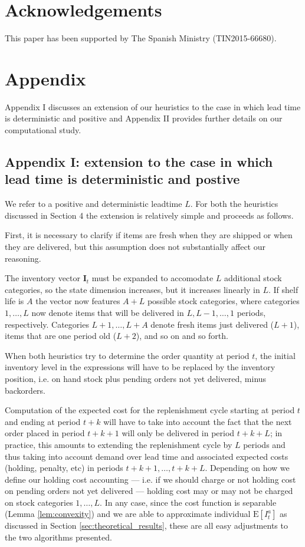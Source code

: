 \documentclass{tPRS2e}
\begin{document}
\section*{Acknowledgements}
This paper has been supported by The Spanish Ministry (TIN2015-66680).



\section*{Appendix}

Appendix I discusses an extension of our heuristics to the case in which lead time is deterministic and positive and Appendix II provides further details on our computational study.

\subsection*{Appendix I: extension to the case in which lead time is deterministic and postive}
\label{sec:appendix_I}

We refer to a positive and deterministic leadtime $L$. For both the heuristics discussed in Section 4 the extension is relatively simple and proceeds as follows. 

First, it is necessary to clarify if items are fresh when they are shipped or when they are delivered, but this assumption does not substantially affect our reasoning. 

The inventory vector $\mathbf{I}_t$ must be expanded to accomodate $L$ additional stock categories, so the state dimension increases, but it increases linearly in $L$. If shelf life is $A$ the vector now features $A+L$ possible stock categories, where categories $1,\ldots, L$ now denote items that will be delivered in $L,L-1,\ldots,1$ periods, respectively. Categories $L+1,\ldots,L+A$ denote fresh items just delivered ($L+1$), items that are one period old ($L+2$), and so on and so forth. 

When both heuristics try to determine the order quantity at period $t$, the initial inventory level in the expressions will have to be replaced by the inventory position, i.e. on hand stock plus pending orders not yet delivered, minus backorders. 

Computation of the expected cost for the replenishment cycle starting at period $t$ and ending at period $t+k$ will have to take into account the fact that the next order placed in period $t+k+1$ will only be delivered in period $t+k+L$; in practice, this amounts to extending the replenishment cycle by $L$ periods and thus taking into account demand over lead time and associated expected costs (holding, penalty, etc) in periods $t+k+1,\ldots,t+k+L$. Depending on how we define our holding cost accounting --- i.e. if we should charge or not holding cost on pending orders not yet delivered --- holding cost may or may not be charged on stock categories $1,\ldots, L$. In any case, since the cost function is separable (Lemma \ref{lem:convexity}) and we are able to approximate individual $\text{E}[I^a_t]$ as discussed in Section \ref{sec:theoretical_results}, these are all easy adjustments to the two algorithms presented. 
\end{document}
